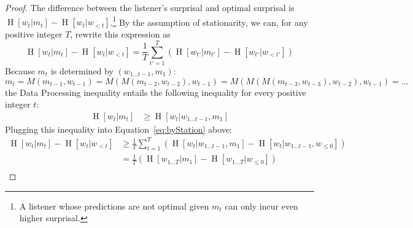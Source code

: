\documentclass[11pt,letterpaper]{article}
\newcounter{theorem}
\newtheorem{lemma}[theorem]{Lemma}
\begin{document}
\begin{proof}
The difference between the listener's surprisal and optimal surprisal is $\operatorname{H}[w_t | m_t] - \operatorname{H}[w_t | w_{<t}]$.\footnote{A listener whose predictions are not optimal given $m_t$ can only incur even higher surprisal.}
By the assumption of stationarity, we can, for any positive integer $T$, rewrite this expression as
\begin{equation}\label{eq:byStation}
\operatorname{H}[w_t | m_t] - \operatorname{H}[w_t | w_{<t}] =  \frac{1}{T} \sum_{t'=1}^{T} \left(\operatorname{H}[w_{t'} | m_{t'}] - \operatorname{H}[w_{t'} | w_{<t'}]\right) 
\end{equation}
%
%
%
Because $m_t$ is determined by $(w_{1 \dots t-1}, m_1)$:
\begin{equation}
	m_t = M(m_{t-1}, w_{t-1}) = M(M(m_{t-2}, w_{t-2}), w_{t-1}) = M(M(M(m_{t-3}, w_{t-3}), w_{t-2}), w_{t-1}) = \dots
\end{equation}
the Data Processing inequality entails the following inequality for every positive integer $t$:
\begin{align}\label{eq:plugged}
\operatorname{H}[w_t | m_t]& \geq \operatorname{H}[w_t|w_{1\dots t-1}, m_1]
\end{align}
Plugging this inequality into Equation~\ref{eq:byStation} above:
\begin{align}\label{eq:plugged}
\operatorname{H}[w_t | m_t] - \operatorname{H}[w_t | w_{<t}]& \geq \frac{1}{T} \sum_{t=1}^T ( \operatorname{H}[w_t|w_{1\dots t-1}, m_1] - \operatorname{H}[w_t | w_{1\dots t-1}, w_{\leq 0}]  )    \\
& = \frac{1}{T} \left(\operatorname{H}[w_{1\dots T} | m_1] - \operatorname{H}[w_{1\dots T} | w_{\leq 0}]\right)  \\

\end{align}
\end{proof}
\end{document}
